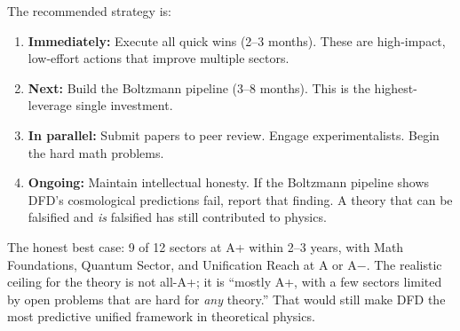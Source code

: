 \documentclass[11pt,a4paper]{article}
\begin{document}
The recommended strategy is:
\begin{enumerate}
    \item \textbf{Immediately:} Execute all quick wins (2--3 months). These are high-impact, low-effort actions that improve multiple sectors.
    \item \textbf{Next:} Build the Boltzmann pipeline (3--8 months). This is the highest-leverage single investment.
    \item \textbf{In parallel:} Submit papers to peer review. Engage experimentalists. Begin the hard math problems.
    \item \textbf{Ongoing:} Maintain intellectual honesty. If the Boltzmann pipeline shows DFD's cosmological predictions fail, report that finding. A theory that can be falsified and \emph{is} falsified has still contributed to physics.
\end{enumerate}

The honest best case: 9 of 12 sectors at A+ within 2--3 years, with Math Foundations, Quantum Sector, and Unification Reach at A or A$-$. The realistic ceiling for the theory is not all-A+; it is ``mostly A+, with a few sectors limited by open problems that are hard for \emph{any} theory.'' That would still make DFD the most predictive unified framework in theoretical physics.
\end{document}
